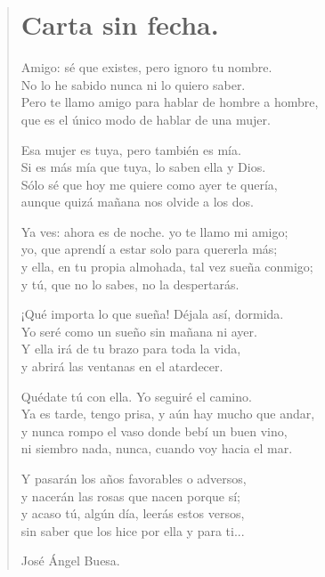 \documentclass[11pt, portrait, twoside, notitlepage, openright]{book}
\begin{document}
\newpage
\begin{verse}
\begin{center}
\section{Carta sin fecha.}
\end{center}
Amigo: sé que existes, pero ignoro tu nombre.\\
No lo he sabido nunca ni lo quiero saber.\\
Pero te llamo amigo para hablar de hombre a hombre,\\
que es el único modo de hablar de una mujer.
\newline

Esa mujer es tuya, pero también es mía.\\
Si es más mía que tuya, lo saben ella y Dios.\\
Sólo sé que hoy me quiere como ayer te quería,\\
aunque quizá mañana nos olvide a los dos.
\newline

Ya ves: ahora es de noche. yo te llamo mi amigo;\\
yo, que aprendí a estar solo para quererla más;\\
y ella, en tu propia almohada, tal vez sueña conmigo;\\
y tú, que no lo sabes, no la despertarás.
\newline

¡Qué importa lo que sueña!  Déjala así, dormida.\\
Yo seré como un sueño sin mañana ni ayer.\\
Y ella irá de tu brazo para toda la vida,\\
y abrirá las ventanas en el atardecer.
\newline

Quédate tú con ella. Yo seguiré el camino.\\
Ya es tarde, tengo prisa, y aún hay mucho que andar,\\
y nunca rompo el vaso donde bebí un buen vino,\\
ni siembro nada, nunca, cuando voy hacia el mar.
\newpage

Y pasarán los años favorables o adversos,\\
y nacerán las rosas que nacen porque sí;\\
y acaso tú, algún día, leerás estos versos,\\
sin saber que los hice por ella y para ti...
\newline

José Ángel Buesa.
\end{verse}
\end{document}
